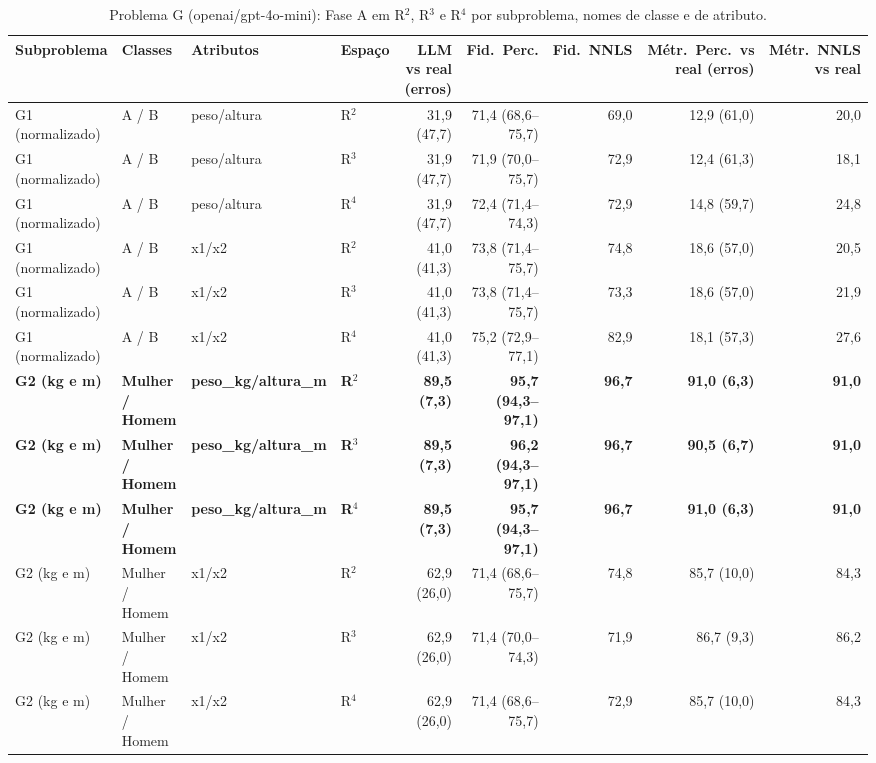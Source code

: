 \begin{table}[htbp]
\centering
\footnotesize
\caption{Problema G (openai/gpt-4o-mini): Fase A em R$^2$, R$^3$ e R$^4$ por subproblema, nomes de classe e de atributo.}
\label{tab:bloco3_G_faseA_R2_R3_R4_gpt4mini}
\begin{tabular}{llllrrrrr}
\toprule
Subproblema & Classes & Atributos & Espaço & LLM vs real (erros) & Fid.\ Perc. & Fid.\ NNLS & Métr.\ Perc.\ vs real (erros) & Métr.\ NNLS vs real \\
\midrule
G1 (normalizado) & A / B & peso/altura & R$^2$ & 31,9 (47,7) & 71,4 (68,6–75,7) & 69,0 & 12,9 (61,0) & 20,0 \\
G1 (normalizado) & A / B & peso/altura & R$^3$ & 31,9 (47,7) & 71,9 (70,0–75,7) & 72,9 & 12,4 (61,3) & 18,1 \\
G1 (normalizado) & A / B & peso/altura & R$^4$ & 31,9 (47,7) & 72,4 (71,4–74,3) & 72,9 & 14,8 (59,7) & 24,8 \\
\midrule
G1 (normalizado) & A / B & x1/x2 & R$^2$ & 41,0 (41,3) & 73,8 (71,4–75,7) & 74,8 & 18,6 (57,0) & 20,5 \\
G1 (normalizado) & A / B & x1/x2 & R$^3$ & 41,0 (41,3) & 73,8 (71,4–75,7) & 73,3 & 18,6 (57,0) & 21,9 \\
G1 (normalizado) & A / B & x1/x2 & R$^4$ & 41,0 (41,3) & 75,2 (72,9–77,1) & 82,9 & 18,1 (57,3) & 27,6 \\
\midrule
\textbf{G2 (kg e m)} & \textbf{Mulher / Homem} & \textbf{peso\_kg/altura\_m} & \textbf{R$^2$} & \textbf{89,5 (7,3)} & \textbf{95,7 (94,3–97,1)} & \textbf{96,7} & \textbf{91,0 (6,3)} & \textbf{91,0} \\
\textbf{G2 (kg e m)} & \textbf{Mulher / Homem} & \textbf{peso\_kg/altura\_m} & \textbf{R$^3$} & \textbf{89,5 (7,3)} & \textbf{96,2 (94,3–97,1)} & \textbf{96,7} & \textbf{90,5 (6,7)} & \textbf{91,0} \\
\textbf{G2 (kg e m)} & \textbf{Mulher / Homem} & \textbf{peso\_kg/altura\_m} & \textbf{R$^4$} & \textbf{89,5 (7,3)} & \textbf{95,7 (94,3–97,1)} & \textbf{96,7} & \textbf{91,0 (6,3)} & \textbf{91,0} \\
\midrule
G2 (kg e m) & Mulher / Homem & x1/x2 & R$^2$ & 62,9 (26,0) & 71,4 (68,6–75,7) & 74,8 & 85,7 (10,0) & 84,3 \\
G2 (kg e m) & Mulher / Homem & x1/x2 & R$^3$ & 62,9 (26,0) & 71,4 (70,0–74,3) & 71,9 & 86,7 (9,3) & 86,2 \\
G2 (kg e m) & Mulher / Homem & x1/x2 & R$^4$ & 62,9 (26,0) & 71,4 (68,6–75,7) & 72,9 & 85,7 (10,0) & 84,3 \\

\end{tabular}
\end{table}
